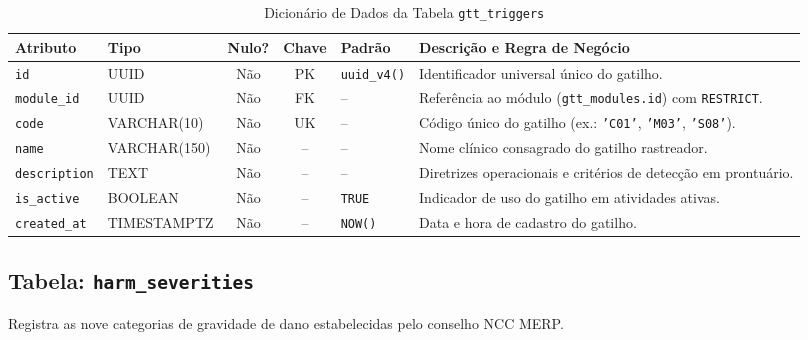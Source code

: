 \begin{table}[!ht]
\centering
\caption{Dicionário de Dados da Tabela \texttt{gtt\_triggers}}
\label{tab_dic_gtt_triggers}
\footnotesize
\begin{tabularx}{\textwidth}{p{3.2cm} p{2.5cm} c c p{1.8cm} X}
\toprule
\textbf{Atributo} & \textbf{Tipo} & \textbf{Nulo?} & \textbf{Chave} & \textbf{Padrão} & \textbf{Descrição e Regra de Negócio} \\
\midrule
\texttt{id} & UUID & Não & PK & \texttt{uuid\_v4()} & Identificador universal único do gatilho. \\
\texttt{module\_id} & UUID & Não & FK & -- & Referência ao módulo (\texttt{gtt\_modules.id}) com \texttt{RESTRICT}. \\
\texttt{code} & VARCHAR(10) & Não & UK & -- & Código único do gatilho (ex.: \texttt{'C01'}, \texttt{'M03'}, \texttt{'S08'}). \\
\texttt{name} & VARCHAR(150) & Não & -- & -- & Nome clínico consagrado do gatilho rastreador. \\
\texttt{description} & TEXT & Não & -- & -- & Diretrizes operacionais e critérios de detecção em prontuário. \\
\texttt{is\_active} & BOOLEAN & Não & -- & \texttt{TRUE} & Indicador de uso do gatilho em atividades ativas. \\
\texttt{created\_at} & TIMESTAMPTZ & Não & -- & \texttt{NOW()} & Data e hora de cadastro do gatilho. \\
\bottomrule
\end{tabularx}
\end{table}

\subsection{Tabela: \texttt{harm\_severities}}
Registra as nove categorias de gravidade de dano estabelecidas pelo conselho NCC MERP.

